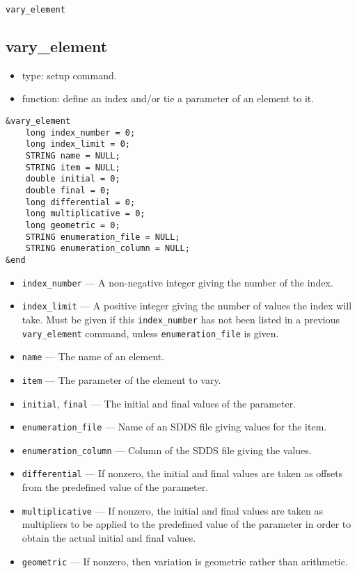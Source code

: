 \documentclass[11pt]{article}
\begin{document}
\begin{latexonly}
\newpage
\begin{center}{\Large\verb|vary_element|}\end{center}
\end{latexonly}
\subsection{vary\_element}

\begin{itemize}
\item type: setup command.
\item function: define an index and/or tie a parameter of an element to it.
\end{itemize}

\begin{verbatim}
&vary_element
    long index_number = 0;
    long index_limit = 0;
    STRING name = NULL;
    STRING item = NULL;
    double initial = 0;
    double final = 0;
    long differential = 0;
    long multiplicative = 0;
    long geometric = 0;
    STRING enumeration_file = NULL;
    STRING enumeration_column = NULL;
&end
\end{verbatim}

\begin{itemize}
\item \verb|index_number| --- A non-negative integer giving the number of the index.
\item \verb|index_limit| --- A positive integer giving the number of values the index will take.
 Must be given if this \verb|index_number| has not been listed in a previous \verb|vary_element|
command, unless \verb|enumeration_file| is given.
\item \verb|name| --- The name of an element.
\item \verb|item| --- The parameter of the element to vary.
\item \verb|initial|, \verb|final| --- The initial and final values of the parameter.
\item \verb|enumeration_file| --- Name of an SDDS file giving values for the item.
\item \verb|enumeration_column| --- Column of the SDDS file giving the values.
\item \verb|differential| --- If nonzero, the initial and final values are taken as
offsets from the predefined value of the parameter.
\item \verb|multiplicative| --- If nonzero, the initial and final values are taken as 
multipliers to be applied to the predefined value of the parameter in order to obtain
the actual initial and final values.
\item \verb|geometric| --- If nonzero, then variation is geometric rather than 
arithmetic.
\end{itemize}
\end{document}
